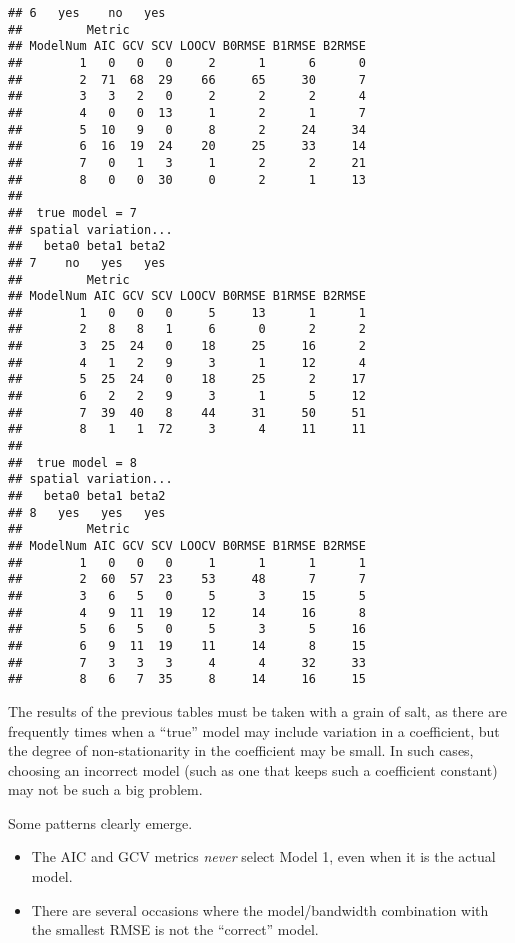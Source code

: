 \documentclass{article}\usepackage[]{graphicx}\usepackage[]{color}
\makeatletter
\newenvironment{kframe}{%
 \def\at@end@of@kframe{}%
 \ifinner\ifhmode%
  \def\at@end@of@kframe{\end{minipage}}%
  \begin{minipage}{\columnwidth}%
 \fi\fi%
 \def\FrameCommand##1{\hskip\@totalleftmargin \hskip-\fboxsep
 \colorbox{shadecolor}{##1}\hskip-\fboxsep
     \hskip-\linewidth \hskip-\@totalleftmargin \hskip\columnwidth}%
 \MakeFramed {\advance\hsize-\width
   \@totalleftmargin\z@ \linewidth\hsize
   \@setminipage}}%
 {\par\unskip\endMakeFramed%
 \at@end@of@kframe}
\newenvironment{knitrout}{}{} %
\makeatother
\begin{document}
\begin{knitrout}
\begin{kframe}
\begin{verbatim}
## 6   yes    no   yes
##         Metric
## ModelNum AIC GCV SCV LOOCV B0RMSE B1RMSE B2RMSE
##        1   0   0   0     2      1      6      0
##        2  71  68  29    66     65     30      7
##        3   3   2   0     2      2      2      4
##        4   0   0  13     1      2      1      7
##        5  10   9   0     8      2     24     34
##        6  16  19  24    20     25     33     14
##        7   0   1   3     1      2      2     21
##        8   0   0  30     0      2      1     13
## 
##  true model = 7 
## spatial variation...
##   beta0 beta1 beta2
## 7    no   yes   yes
##         Metric
## ModelNum AIC GCV SCV LOOCV B0RMSE B1RMSE B2RMSE
##        1   0   0   0     5     13      1      1
##        2   8   8   1     6      0      2      2
##        3  25  24   0    18     25     16      2
##        4   1   2   9     3      1     12      4
##        5  25  24   0    18     25      2     17
##        6   2   2   9     3      1      5     12
##        7  39  40   8    44     31     50     51
##        8   1   1  72     3      4     11     11
## 
##  true model = 8 
## spatial variation...
##   beta0 beta1 beta2
## 8   yes   yes   yes
##         Metric
## ModelNum AIC GCV SCV LOOCV B0RMSE B1RMSE B2RMSE
##        1   0   0   0     1      1      1      1
##        2  60  57  23    53     48      7      7
##        3   6   5   0     5      3     15      5
##        4   9  11  19    12     14     16      8
##        5   6   5   0     5      3      5     16
##        6   9  11  19    11     14      8     15
##        7   3   3   3     4      4     32     33
##        8   6   7  35     8     14     16     15
\end{verbatim}
\end{kframe}
\end{knitrout}


The results of the previous tables must be taken with a grain of salt, as there are frequently times when a ``true'' model may include variation in a coefficient, but the degree of non-stationarity in the coefficient may be small. In such cases, choosing an incorrect model (such as one that keeps such a coefficient constant) may not be such a big problem. 

Some patterns clearly emerge. 
\begin{itemize}
\item The AIC and GCV metrics \emph{never} select Model 1, even when it is the actual model.
\item There are several occasions where the model/bandwidth combination with the smallest RMSE is not the ``correct'' model.
\end{itemize}
\end{document}
